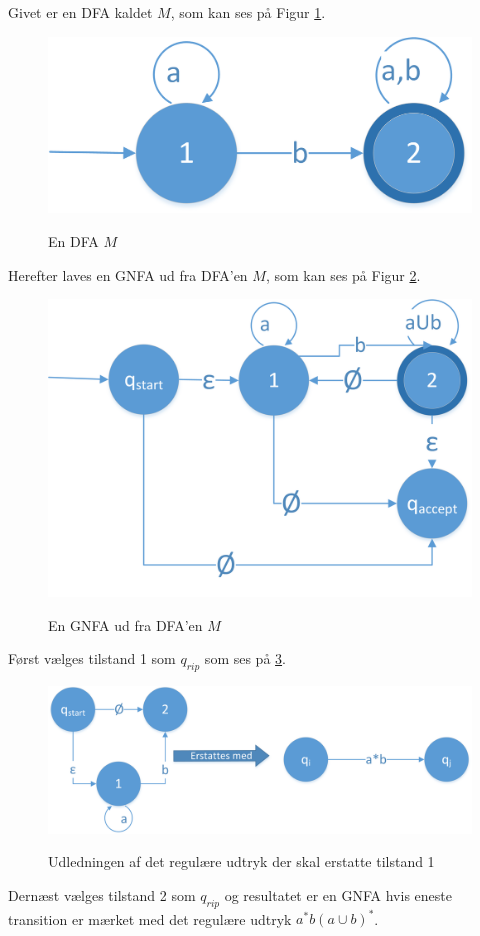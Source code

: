 \documentclass[a4paper,10pt,article]{memoir}
\begin{document}
\begin{eksempel}
Givet er en DFA kaldet $M$, som kan ses på Figur \ref{fig:fig20}.
\begin{figure}[H]%
{\centering 
\includegraphics[width=\textwidth]{Fig20x.png}
} \caption{En DFA $M$}
\label{fig:fig20}
\end{figure}

Herefter laves en GNFA ud fra DFA'en $M$, som kan ses på Figur \ref{fig:fig21}.
\begin{figure}[H]%
{\centering 
\includegraphics[width=\textwidth]{Fig21x.png}
} \caption{En GNFA ud fra DFA'en $M$}
\label{fig:fig21}
\end{figure}

Først vælges tilstand 1 som $q_{rip}$ som ses på \ref{fig:fig22}.
\begin{figure}[H]%
{\centering 
\includegraphics[width=\textwidth]{Fig22x.png}
} \caption{Udledningen af det regulære udtryk der skal erstatte tilstand
  1}
\label{fig:fig22}
\end{figure}
Dernæst vælges tilstand 2 som $q_{rip}$ og resultatet er en GNFA hvis
eneste transition er mærket med det regulære udtryk $a^*b(a\cup b)^*$.
\end{eksempel}
\end{document}
